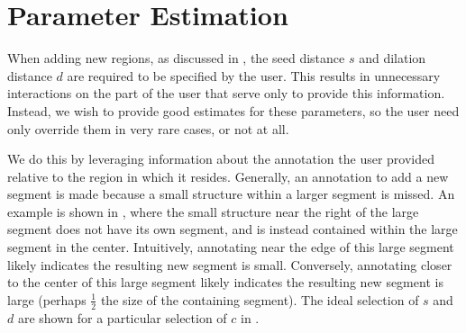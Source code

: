 \documentclass[]{spie}  %
\begin{document}
\section{Parameter Estimation}
\label{sec:param}

When adding new regions, as discussed in , the seed
distance $s$ and dilation distance $d$ are required to be specified by
the user.  This results in unnecessary interactions on the part of the
user that serve only to provide this information.  Instead, we wish to
provide good estimates for these parameters, so the user need only
override them in very rare cases, or not at all.

We do this by leveraging information about the annotation the user
provided relative to the region in which it resides.  Generally, an
annotation to add a new segment is made because a small structure
within a larger segment is missed.  An example is shown in
, where the small structure near the right of the
large segment does not have its own segment, and is instead contained
within the large segment in the center.  Intuitively, annotating near
the edge of this large segment likely indicates the resulting new
segment is small.  Conversely, annotating closer to the center of this
large segment likely indicates the resulting new segment is large
(perhaps $\frac{1}{2}$ the size of the containing segment).  The ideal
selection of $s$ and $d$ are shown for a particular selection of $c$
in .
\begin{figure}[htbp]
\centering
{}
\hspace{0.1em}
\hspace{0.1em}
\caption{} \label{fig:param}
\end{figure}
\end{document}
